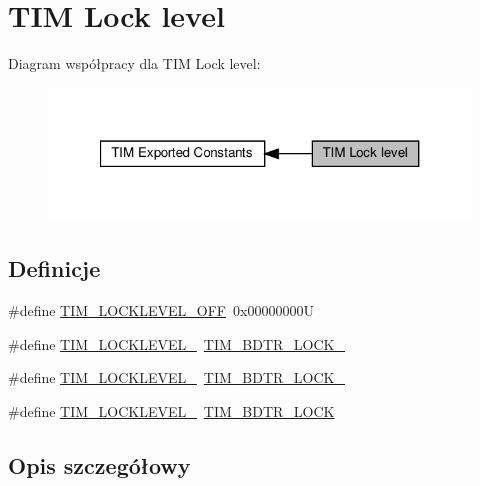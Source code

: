 \hypertarget{group___t_i_m___lock__level}{}\section{T\+IM Lock level}
\label{group___t_i_m___lock__level}
Diagram współpracy dla T\+IM Lock level\+:\nopagebreak
\begin{figure}[H]
\begin{center}
\leavevmode
\includegraphics[width=321pt]{group___t_i_m___lock__level}
\end{center}
\end{figure}
\subsection*{Definicje}
\begin{DoxyCompactItemize}
\item 
\#define \hyperlink{group___t_i_m___lock__level_ga304aece56a9391a4d9b1016144d98fbd}{T\+I\+M\+\_\+\+L\+O\+C\+K\+L\+E\+V\+E\+L\+\_\+\+O\+FF}~0x00000000U
\item 
\#define \hyperlink{group___t_i_m___lock__level_ga46dc7705788ba2ce5135c43b998ef4dd}{T\+I\+M\+\_\+\+L\+O\+C\+K\+L\+E\+V\+E\+L\+\_}~\hyperlink{group___peripheral___registers___bits___definition_gabbd1736c8172e7cd098bb591264b07bf}{T\+I\+M\+\_\+\+B\+D\+T\+R\+\_\+\+L\+O\+C\+K\+\_}
\item 
\#define \hyperlink{group___t_i_m___lock__level_ga03a5ed2aded43ccfe7ab12a9dd53d251}{T\+I\+M\+\_\+\+L\+O\+C\+K\+L\+E\+V\+E\+L\+\_}~\hyperlink{group___peripheral___registers___bits___definition_ga756df80ff8c34399435f52dca18e6eee}{T\+I\+M\+\_\+\+B\+D\+T\+R\+\_\+\+L\+O\+C\+K\+\_}
\item 
\#define \hyperlink{group___t_i_m___lock__level_gaa1afed375c27151608e388fdf4a57a13}{T\+I\+M\+\_\+\+L\+O\+C\+K\+L\+E\+V\+E\+L\+\_}~\hyperlink{group___peripheral___registers___bits___definition_ga7e4215d17f0548dfcf0b15fe4d0f4651}{T\+I\+M\+\_\+\+B\+D\+T\+R\+\_\+\+L\+O\+CK}
\end{DoxyCompactItemize}


\subsection{Opis szczegółowy}


